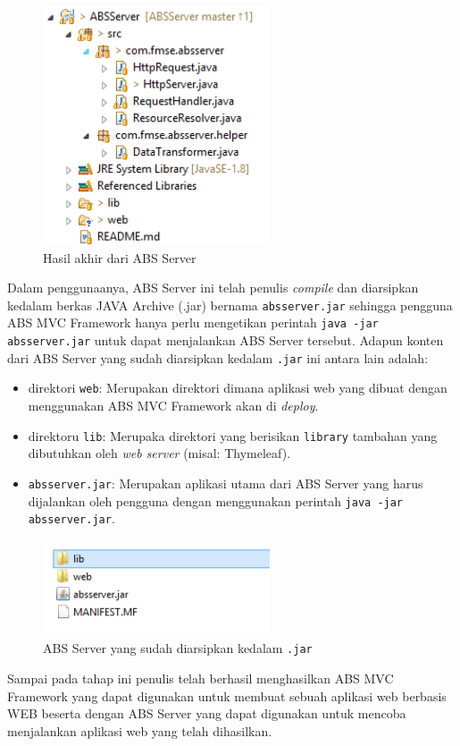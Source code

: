 \begin{figure}
    \centering
    \includegraphics[width=0.6\textwidth]{img/abs-server-source.png}
    \caption{Hasil akhir dari ABS Server}
    \label{fig:absServer}
\end{figure}

Dalam penggunaanya, ABS Server ini telah penulis \textit{compile} dan diarsipkan kedalam berkas JAVA Archive (.jar) bernama \texttt{absserver.jar} sehingga pengguna ABS MVC Framework hanya perlu mengetikan perintah \texttt{java -jar absserver.jar} untuk dapat menjalankan ABS Server tersebut. Adapun konten dari ABS Server yang sudah diarsipkan kedalam \texttt{.jar} ini antara lain adalah:

\begin{itemize}
    \item direktori \texttt{web}: Merupakan direktori dimana aplikasi web yang dibuat dengan menggunakan ABS MVC Framework akan di \textit{deploy}.
    \item direktoru \texttt{lib}: Merupaka direktori yang berisikan \texttt{library} tambahan yang dibutuhkan oleh \textit{web server} (misal: Thymeleaf).
    \item \texttt{absserver.jar}: Merupakan aplikasi utama dari ABS Server yang harus dijalankan oleh pengguna dengan menggunakan perintah \texttt{java -jar absserver.jar}.
\end{itemize}

\begin{figure}
    \centering
    \includegraphics[width=0.6\textwidth]{img/abs-server.png}
    \caption{ABS Server yang sudah diarsipkan kedalam \texttt{.jar}}
    \label{fig:absServerJar}
\end{figure}

Sampai pada tahap ini penulis telah berhasil menghasilkan ABS MVC Framework yang dapat digunakan untuk membuat sebuah aplikasi web berbasis WEB beserta dengan ABS Server yang dapat digunakan untuk mencoba menjalankan aplikasi web yang telah dihasilkan.